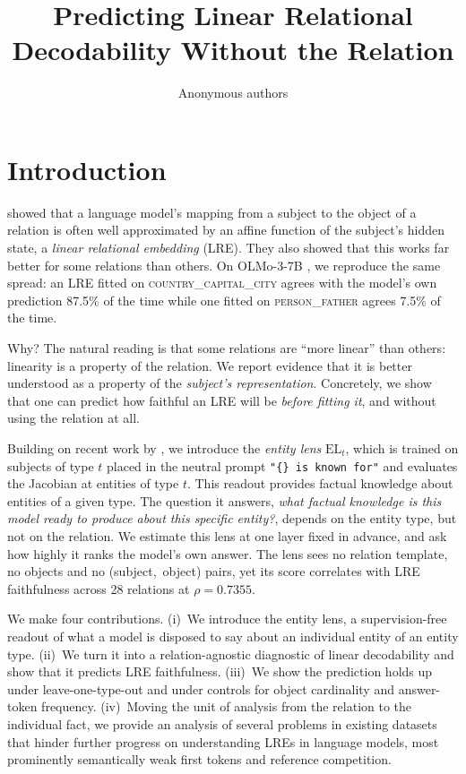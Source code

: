 \documentclass{article}
\title{Predicting Linear Relational\\Decodability Without the Relation}
\author{Anonymous authors}
\def\headlinenumber{0.7355}
\begin{document}
\maketitle
\ifdefined\arxivversion
  \lhead{}
  \renewcommand{\headrulewidth}{0pt}
\fi





\section{Introduction}


\citet{hernandez2024linearity} showed that a language model's mapping from
a subject to the object of a relation is often well approximated by an
affine function of the subject's hidden state, a \emph{linear relational
embedding} (LRE). They also showed that this works far better for some
relations than others. On OLMo-3-7B \citep{olmo2025olmo3}, we reproduce the same spread: an LRE
fitted on \textsc{country\_capital\_city} agrees with the model's own
prediction 87.5\% of the time while one fitted on \textsc{person\_father}
agrees 7.5\% of the time.

Why? The natural reading is that some relations are ``more linear'' than
others: linearity is a property of the relation. We report evidence
that it is better understood as a property of the \emph{subject's
representation}. Concretely, we show that one can predict how faithful an
LRE will be \emph{before fitting it}, and without using the relation at
all.


Building on recent work by \citet{gurnee2026workspace},
we  introduce the \emph{entity lens} $\mbox{EL}_t$, which
is trained on subjects of type $t$ placed in the neutral prompt
\texttt{"\{\} is known for"} and
evaluates the Jacobian at entities of type $t$. This readout provides factual knowledge about entities of a given type.
The question it answers, \emph{what factual knowledge is this model ready to produce about this specific entity?}, depends on the entity type, but not on the relation.
We estimate this lens at one layer fixed in advance,
and ask how highly it ranks the model's own answer. The lens sees no
relation template, no objects and no (subject,~object) pairs, yet its
score correlates with LRE faithfulness across 28 relations at
$\rho = \headlinenumber $.

We make four contributions. (i)~We introduce the entity
lens, a supervision-free readout of what a model is disposed to say about
an individual entity of an entity type. (ii)~We turn it into a relation-agnostic diagnostic
of linear decodability and show that it predicts LRE faithfulness.
(iii)~We show the prediction holds up
under leave-one-type-out and under controls for object
cardinality and answer-token frequency.
(iv)~Moving
the unit of
analysis from the relation to the individual fact,
we provide an analysis of several
problems in existing datasets that hinder further
progress on understanding LREs in language models, most prominently
semantically
weak first tokens
and reference competition. 
\end{document}
